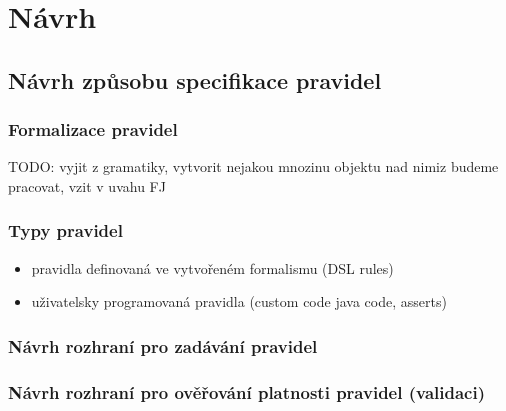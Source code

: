 \chapter{Návrh}

\section{Návrh způsobu specifikace pravidel}

\subsection{Formalizace pravidel}

TODO: vyjit z gramatiky, vytvorit nejakou mnozinu objektu nad nimiz budeme pracovat, vzit v uvahu FJ

\subsection{Typy pravidel}
\begin{itemize}
\item pravidla definovaná ve vytvořeném formalismu (DSL rules)
\item uživatelsky programovaná pravidla (custom code java code, asserts)
\end{itemize}

\subsection{Návrh rozhraní pro zadávání pravidel}

\subsection{Návrh rozhraní pro ověřování platnosti pravidel (validaci)}

